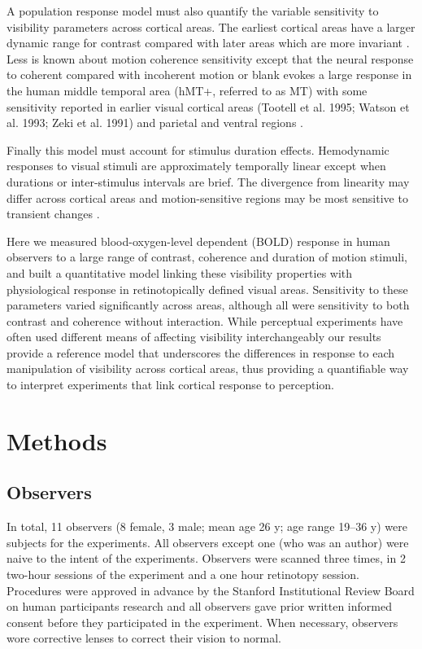 A population response model must also quantify the variable sensitivity to visibility parameters across cortical areas. The earliest cortical areas have a larger dynamic range for contrast compared with later areas which are more invariant \citep{Avidan2002-jg,Cheng1994-ic,Rolls1986-wr,Sclar1990-lk}. Less is known about motion coherence sensitivity except that the neural response to coherent compared with incoherent motion or blank evokes a large response in the human middle temporal area (hMT+, referred to as MT) with some sensitivity reported in earlier visual cortical areas \citep{Ajina2015-xm,Costagli2014-kg,Dupont1994-yi,Heeger1999-ii} (Tootell et al. 1995; Watson et al. 1993; Zeki et al. 1991) and parietal and ventral regions \citep{Braddick2001-pp}.

Finally this model must account for stimulus duration effects. Hemodynamic responses to visual stimuli are approximately temporally linear except when durations \citep{Boynton1996-ff,Boynton2012-xy} or inter-stimulus intervals \citep{Huettel2000-ji} are brief. The divergence from linearity may differ across cortical areas \citep{Birn2001-tp} and motion-sensitive regions may be most sensitive to transient changes \citep{Stigliani2017-oe}.

Here we measured blood-oxygen-level dependent (BOLD) \citep{Ogawa1990-er} response in human observers to a large range of contrast, coherence and duration of motion stimuli, and built a quantitative model linking these visibility properties with physiological response in retinotopically defined visual areas. Sensitivity to these parameters varied significantly across areas, although all were sensitivity to both contrast and coherence without interaction. While perceptual experiments have often used different means of affecting visibility interchangeably our results provide a reference model that underscores the differences in response to each manipulation of visibility across cortical areas, thus providing a quantifiable way to interpret experiments that link cortical response to perception.

\section{Methods}

\subsection{Observers}

In total, 11 observers (8 female, 3 male; mean age 26 y; age range 19–36 y) were subjects for the experiments. All observers except one (who was an author) were naive to the intent of the experiments. Observers were scanned three times, in 2 two-hour sessions of the experiment and a one hour retinotopy session. Procedures were approved in advance by the Stanford Institutional Review Board on human participants research and all observers gave prior written informed consent before they participated in the experiment. When necessary, observers wore corrective lenses to correct their vision to normal.


